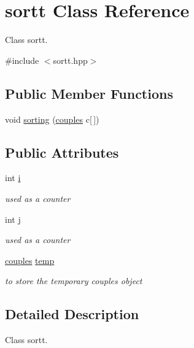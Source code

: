 \hypertarget{classsortt}{\section{sortt Class Reference}
\label{classsortt}
}


Class sortt.  




{\ttfamily \#include $<$sortt.\-hpp$>$}

\subsection*{Public Member Functions}
\begin{DoxyCompactItemize}
\item 
void \hyperlink{classsortt_ab39ce4840d31c32e3956558da4d64bc0}{sorting} (\hyperlink{classcouples}{couples} c\mbox{[}$\,$\mbox{]})
\end{DoxyCompactItemize}
\subsection*{Public Attributes}
\begin{DoxyCompactItemize}
\item 
int \hyperlink{classsortt_aad9f89743b9d8a0c77438aede2cc175f}{i}
\begin{DoxyCompactList}\small\item\em used as a counter \end{DoxyCompactList}\item 
int \hyperlink{classsortt_a896d2e4e8ea5a23d89592223198ed744}{j}
\begin{DoxyCompactList}\small\item\em used as a counter \end{DoxyCompactList}\item 
\hyperlink{classcouples}{couples} \hyperlink{classsortt_a22e8bd7d6844cac8221dbffe860b7456}{temp}
\begin{DoxyCompactList}\small\item\em to store the temporary couples object \end{DoxyCompactList}\end{DoxyCompactItemize}


\subsection{Detailed Description}
Class sortt. 

